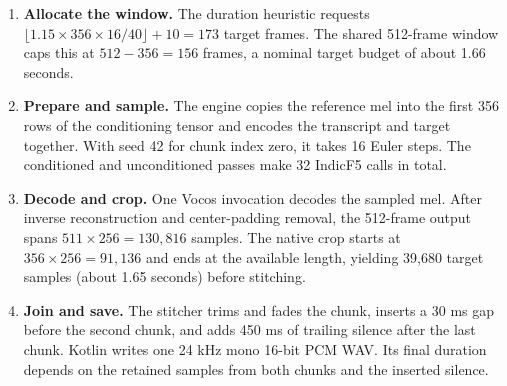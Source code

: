 \begin{enumerate}[nosep]
  \item \textbf{Allocate the window.} The duration heuristic requests
        $\lfloor 1.15\times356\times16/40\rfloor+10=173$ target frames.
        The shared 512-frame window caps this at $512-356=156$ frames,
        a nominal target budget of about 1.66 seconds.
  \item \textbf{Prepare and sample.} The engine copies the reference mel into
        the first 356 rows of the conditioning tensor and encodes the
        transcript and target together. With seed 42 for chunk index zero,
        it takes 16 Euler steps. The conditioned and unconditioned passes
        make 32 IndicF5 calls in total.
  \item \textbf{Decode and crop.} One Vocos invocation decodes the sampled
        mel. After inverse reconstruction and center-padding removal, the
        512-frame output spans $511\times256=130{,}816$ samples. The native
        crop starts at $356\times256=91{,}136$ and ends at the available
        length, yielding 39,680 target samples (about 1.65 seconds) before
        stitching.
  \item \textbf{Join and save.} The stitcher trims and fades the chunk,
        inserts a 30 ms gap before the second chunk, and adds 450 ms of
        trailing silence after the last chunk. Kotlin writes one 24 kHz
        mono 16-bit PCM WAV. Its final duration depends on the retained
        samples from both chunks and the inserted silence.
\end{enumerate}
